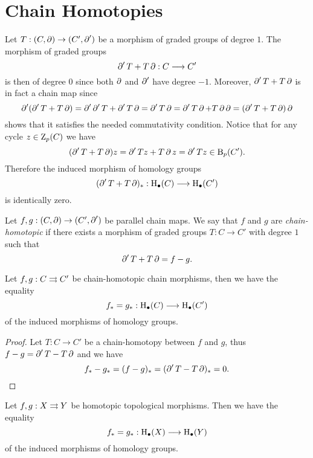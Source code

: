 \section{Chain Homotopies}

Let \(T: (C, \operatorname{\partial}) \to (C', \operatorname{\partial}')\) be a morphism of
graded groups of degree \(1\). The morphism of graded groups
\[
\operatorname{\partial}' T + T \operatorname{\partial}: C \longrightarrow C'
\]
is then of degree \(0\) since both \(\operatorname{\partial}\) and \(\operatorname{\partial}'\) have degree
\(-1\). Moreover, \(\operatorname{\partial}' T + T \operatorname{\partial}\) is in fact a chain map since
\[
\operatorname{\partial}'(\operatorname{\partial}' T + T \operatorname{\partial})
= \operatorname{\partial}' \operatorname{\partial}' T + \operatorname{\partial}' T \operatorname{\partial}
= \operatorname{\partial}' T \operatorname{\partial}
= \operatorname{\partial}' T \operatorname{\partial} + T \operatorname{\partial} \operatorname{\partial}
= (\operatorname{\partial}' T + T \operatorname{\partial}) \operatorname{\partial}
\]
shows that it satisfies the needed commutativity condition. Notice that for any
cycle \(z \in \operatorname{Z}_p(C)\) we have
\[
(\operatorname{\partial}' T + T \operatorname{\partial}) z = \operatorname{\partial}' T z + T \operatorname{\partial} z = \operatorname{\partial}' T z \in \operatorname{B}_p(C').
\]
Therefore the induced morphism of homology groups
\[
(\operatorname{\partial}' T + T \operatorname{\partial})_{*}: \operatorname{H}_{\bullet}(C) \longrightarrow \operatorname{H}_{\bullet}(C')
\]
is identically zero.

\begin{definition}
\label{def:chain-homotopic-maps}
Let \(f, g: (C, \operatorname{\partial}) \to (C', \operatorname{\partial}')\) be parallel chain
maps. We say that \(f\) and \(g\) are \emph{chain-homotopic} if there exists a
morphism of graded groups \(T: C \to C'\) with degree \(1\)
such that
\[
\operatorname{\partial}' T + T \operatorname{\partial} = f - g.
\]
\end{definition}

\begin{proposition}
\label{prop:homotopic-chain-maps-equal-induced-homology-morphisms}
Let \(f, g: C \rightrightarrows C'\) be chain-homotopic chain morphisms, then we have the
equality
\[
f_{*} = g_{*}: \operatorname{H}_{\bullet}(C) \longrightarrow \operatorname{H}_{\bullet}(C')
\]
of the induced morphisms of homology groups.
\end{proposition}

\begin{proof}
Let \(T: C \to C'\) be a chain-homotopy between \(f\) and \(g\), thus \(f - g =
\operatorname{\partial}' T - T \operatorname{\partial}\) and we have
\[
f_{*} - g_{*} = (f - g)_{*} = (\operatorname{\partial}' T - T \operatorname{\partial})_{*} = 0.
\]
\end{proof}

\begin{theorem}
\label{thm:homotopic-maps-equal-induced-homology-morphism}
Let \(f, g: X \rightrightarrows Y\) be homotopic topological morphisms. Then we have the
equality
\[
f_{*} = g_{*}: \operatorname{H}_{\bullet}(X) \longrightarrow \operatorname{H}_{\bullet}(Y)
\]
of the induced morphisms of homology groups.
\end{theorem}

